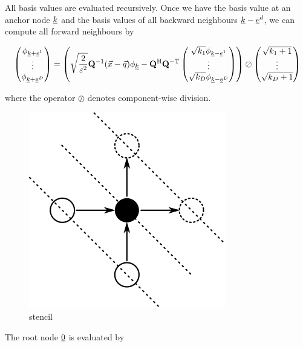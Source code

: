 \documentclass{article}
\begin{document}
All basis values are evaluated recursively. Once we have the basis value at an anchor node $\underline{k}$
and the basis values of all backward neighbours $\underline{k}-\underline{e}^d$, we can compute
all forward neighbours by

\begin{equation}
  \begin{pmatrix}
    \phi_{\underline{k}+\underline{e}^1} \\
    \vdots \\
    \phi_{\underline{k}+\underline{e}^D}
  \end{pmatrix}
  = \left(
  \sqrt{\frac{2}{\varepsilon^2}} \mathbf{Q}^\mathrm{-1} (\vec{x}-\vec{q}) \phi_{\underline{k}}
  - \mathbf{Q}^\mathrm{H} \mathbf{Q}^\mathrm{-T}
  \begin{pmatrix}
    \sqrt{k_1} \phi_{\underline{k}-\underline{e}^1} \\
    \vdots \\
    \sqrt{k_D} \phi_{\underline{k}-\underline{e}^D}
  \end{pmatrix}
  \right)
  \oslash
  \begin{pmatrix}
    \sqrt{k_1+1}\\
    \vdots \\
    \sqrt{k_D+1}
  \end{pmatrix}
\end{equation}

where the operator $\oslash$ denotes component-wise division.

\begin{figure}[H]
    \centering
    \includegraphics[]{basis_eval_stencil}
    \caption{stencil}
\end{figure}

The root node $\underline{0}$ is evaluated by
\end{document}
